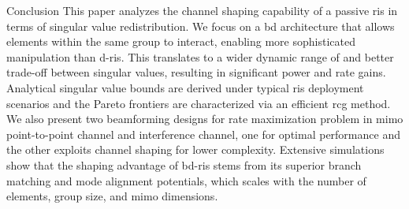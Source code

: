 \documentclass[journal]{IEEEtran}
\begin{document}
\begin{section}{Conclusion}
	This paper analyzes the channel shaping capability of a passive \gls{ris} in terms of singular value redistribution.
	We focus on a \gls{bd} architecture that allows elements within the same group to interact, enabling more sophisticated manipulation than \gls{d}-\gls{ris}.
	This translates to a wider dynamic range of and better trade-off between singular values, resulting in significant power and rate gains.
	Analytical singular value bounds are derived under typical \gls{ris} deployment scenarios and the Pareto frontiers are characterized via an efficient \gls{rcg} method.
	We also present two beamforming designs for rate maximization problem in \gls{mimo} point-to-point channel and interference channel, one for optimal performance and the other exploits channel shaping for lower complexity.
	Extensive simulations show that the shaping advantage of \gls{bd}-\gls{ris} stems from its superior branch matching and mode alignment potentials, which scales with the number of elements, group size, and \gls{mimo} dimensions.

\end{section}
\end{document}
